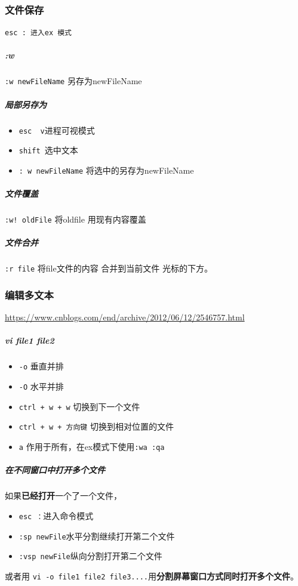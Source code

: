 \documentclass[UTF8,a4paper,12pt]{ctexbook}
\begin{document}
			\subsubsection{文件保存}
				\verb|esc : 进入ex 模式|
				\subparagraph{:w} \verb|:w newFileName| 另存为newFileName
				\subparagraph{局部另存为}
					\begin{itemize}
						\item \verb|esc  v|进程可视模式
						\item \verb|shift |选中文本
						\item \verb|: w newFileName| 将选中的另存为newFileName
					\end{itemize}			
				
				\subparagraph{文件覆盖}
					\verb|:w! oldFile| 将oldfile 用现有内容覆盖
						
						
				\subparagraph{文件合并}
					\verb|:r file| 将file文件的内容 合并到当前文件 光标的下方。
					
			\subsubsection{编辑多文本}
				\url{https://www.cnblogs.com/end/archive/2012/06/12/2546757.html}
				\subparagraph{vi file1 file2 }
					\begin{itemize}[itemindent = 2em]
						\item \verb|-o| 垂直并排
						\item \verb|-O| 水平并排
						\item \verb|ctrl + w + w| 切换到下一个文件
						\item \verb|ctrl + w + 方向键| 切换到相对位置的文件
						\item \verb|a| 作用于所有，在ex模式下使用\verb|:wa :qa|
					\end{itemize}
				
				\subparagraph{在不同窗口中打开多个文件}	
					如果\textbf{已经打开}一个了一个文件，
					
					\begin{itemize}[itemindent = 2em]
						\item \verb|esc ：|进入命令模式
						\item \verb|:sp newFile|水平分割继续打开第二个文件
						\item \verb|:vsp newFile|纵向分割打开第二个文件
					\end{itemize}
				
					或者用 \verb|vi -o file1 file2 file3....|用\textbf{分割屏幕窗口方式同时打开多个文件}。
					
\end{document}
